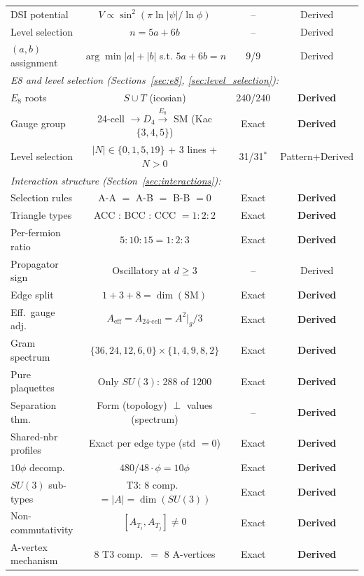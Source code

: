 \documentclass[12pt,a4paper]{article}
\begin{document}
\begin{table}[H]
\begin{tabular}{lccc}
DSI potential & $V \propto \sin^2(\pi\ln|\psi|/\ln\phi)$ & -- & Derived \\
Level selection & $n = 5a + 6b$ & -- & Derived \\
$(a,b)$ assignment & $\arg\min|a|+|b|$ s.t. $5a+6b=n$ & 9/9 & Derived \\
\midrule
\multicolumn{4}{l}{\textit{E8 and level selection (Sections~\ref{sec:e8}, \ref{sec:level_selection}):}} \\
$E_8$ roots & $S \cup T$ (icosian) & 240/240 & \textbf{Derived} \\
Gauge group & 24-cell $\to D_4 \xrightarrow{E_8}$ SM (Kac $\{3,4,5\}$) & Exact & \textbf{Derived} \\
Level selection & $|N| \in \{0,1,5,19\}$ + 3 lines + $N>0$ & 31/31$^*$ & Pattern+Derived \\
\midrule
\multicolumn{4}{l}{\textit{Interaction structure (Section~\ref{sec:interactions}):}} \\
Selection rules & A-A $=$ A-B $=$ B-B $= 0$ & Exact & \textbf{Derived} \\
Triangle types & ACC : BCC : CCC $= 1:2:2$ & Exact & \textbf{Derived} \\
Per-fermion ratio & $5:10:15 = 1:2:3$ & Exact & \textbf{Derived} \\
Propagator sign & Oscillatory at $d \geq 3$ & -- & Derived \\
Edge split & $1 + 3 + 8 = \dim(\text{SM})$ & Exact & \textbf{Derived} \\
Eff.\ gauge adj. & $A_{\text{eff}} = A_{\text{24-cell}} = A^2|_g/3$ & Exact & \textbf{Derived} \\
Gram spectrum & $\{36,24,12,6,0\} \times \{1,4,9,8,2\}$ & Exact & \textbf{Derived} \\
Pure plaquettes & Only $SU(3)$: 288 of 1200 & Exact & \textbf{Derived} \\
Separation thm. & Form (topology) $\perp$ values (spectrum) & -- & \textbf{Derived} \\
Shared-nbr profiles & Exact per edge type (std $= 0$) & Exact & \textbf{Derived} \\
$10\phi$ decomp. & $480/48 \cdot \phi = 10\phi$ & Exact & \textbf{Derived} \\
$SU(3)$ sub-types & T3: 8 comp.\ $= |A| = \dim(SU(3))$ & Exact & \textbf{Derived} \\
Non-commutativity & $[A_{T_i}, A_{T_j}] \neq 0$ & Exact & \textbf{Derived} \\
A-vertex mechanism & 8 T3 comp.\ $=$ 8 A-vertices & Exact & \textbf{Derived} \\

\end{tabular}
\end{table}
\end{document}

